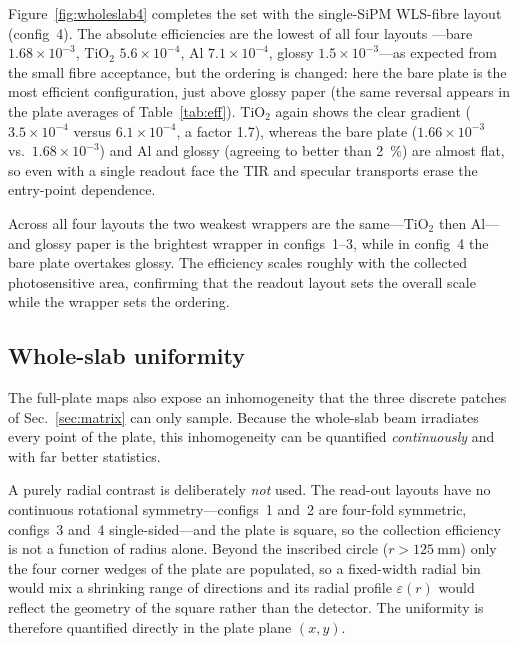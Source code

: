 \documentclass[11pt,a4paper]{article}
\begin{document}
Figure~\ref{fig:wholeslab4} completes the set with the single-SiPM WLS-fibre
layout (config~4). The absolute efficiencies are the lowest of all four layouts
---bare $1.68\times10^{-3}$, TiO$_2$ $5.6\times10^{-4}$, Al
$7.1\times10^{-4}$, glossy $1.5\times10^{-3}$---as expected from the small
fibre acceptance, but the ordering is changed: here the bare plate is the most
efficient configuration, just above glossy paper (the same reversal appears in
the plate averages of Table~\ref{tab:eff}). TiO$_2$ again shows the clear gradient
($3.5\times10^{-4}$ versus $6.1\times10^{-4}$, a factor \num{1.7}), whereas the
bare plate ($1.66\times10^{-3}$ vs.\ $1.68\times10^{-3}$) and Al and glossy (agreeing to
better than \SI{2}{\percent}) are almost flat, so even with a single readout face
the TIR and specular transports erase the entry-point dependence.

Across all four layouts the two weakest wrappers are the same---TiO$_2$ then
Al---and glossy paper is the brightest wrapper in configs~1--3, while in
config~4 the bare plate overtakes glossy. The efficiency scales roughly with the
collected photosensitive area, confirming that the readout layout sets the
overall scale while the wrapper sets the ordering.

\subsection{Whole-slab uniformity}
\label{sec:wholeunif}

The full-plate maps also expose an inhomogeneity that the three discrete
patches of Sec.~\ref{sec:matrix} can only sample.  Because the whole-slab beam
irradiates every point of the plate, this inhomogeneity can be quantified
\emph{continuously} and with far better statistics.

A purely radial contrast is deliberately \emph{not} used.  The read-out layouts
have no continuous rotational symmetry---configs~1 and~2 are four-fold
symmetric, configs~3 and~4 single-sided---and the plate is square, so the
collection efficiency is not a function of radius alone.  Beyond the inscribed
circle ($r > \SI{125}{\milli\meter}$) only the four corner wedges of the plate
are populated, so a fixed-width radial bin would mix a shrinking range of
directions and its radial profile $\varepsilon(r)$ would reflect the geometry of
the square rather than the detector.  The uniformity is therefore quantified directly in
the plate plane $(x,y)$.
\end{document}
